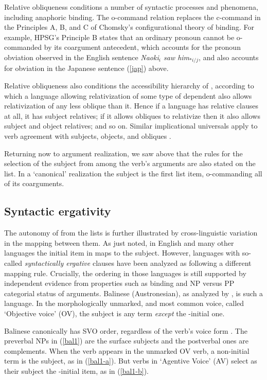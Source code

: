 \documentclass[output=paper]{langsci/langscibook}
\begin{document}
Relative obliqueness conditions a number of syntactic processes and phenomena, including anaphoric binding.  The o-command relation replaces the c-command in the Principles A, B, and C of Chomsky's \citeyearpar{chomsky:1981} configurational theory of binding.  For example, HPSG's Principle B states that an ordinary pronoun cannot be o-commanded by its coargument antecedent, which accounts for the pronoun obviation observed in the English sentence \textit{Naoki$_i$ saw him$_{*i/j}$}, and also accounts for obviation in the Japanese sentence (\ref{jap}) above.  

Relative obliqueness also conditions the accessibility hierarchy of \citet{KeenanandComrie1977}, according to which a language allowing relativization of some type of dependent also allows relativization of any less oblique than it.  Hence if a language has relative clauses at all, it has subject relatives; if it allows obliques to relativize then it also allows subject and object relatives; and so on.  
Similar implicational universals apply to verb agreement with subjects, objects, and obliques \citet{greenberg:1966}.  

Returning now to argument realization, we saw above that the rules for the selection of the subject from among the verb's arguments are also stated on the \argst list.  In a `canonical' realization the subject is the first list item, o-commanding all of its coarguments.  

\subsection{Syntactic ergativity}
The autonomy of \argst from the \val lists is further illustrated by cross-linguistic variation in the mapping between them.  As just noted, in English and many other languages the initial item in \argst maps to the subject.  However,  languages with so-called \textit{syntactically ergative} clauses have been analyzed as following a different mapping rule.  Crucially, the \argst ordering in those languages is still supported by independent evidence from properties such as binding and NP versus PP categorial status of arguments.
Balinese (Austronesian), as analyzed by \citet{Wechsler+Arka:1998}, is such a language.  In the morphologically unmarked, and most common voice, called `Objective voice' (OV), the subject is any term \textit{except} the \argst-initial one.   

Balinese canonically has SVO order, regardless of the verb's voice form \citep{Artawa1994, Wechsler+Arka:1998}.  The preverbal NPs in  (\ref{bal1}) are the surface subjects and the postverbal ones are complements.  When the verb appears in the unmarked OV verb, a non-initial term is the subject, as in (\ref{bal1-a}).    But verbs in `Agentive Voice' (AV) select as their subject the \argst{}-initial item, as in (\ref{bal1-b}).  
\end{document}
